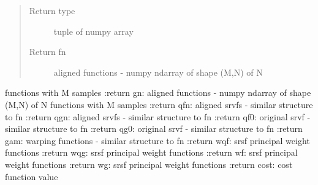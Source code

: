 \documentclass[letterpaper,10pt,english]{sphinxmanual}
\begin{document}
\begin{fulllineitems}
\begin{quote}
\begin{description}
\item[{Return type}] \leavevmode
tuple of numpy array

\item[{Return fn}] \leavevmode
aligned functions - numpy ndarray of shape (M,N) of N

\end{description}\end{quote}

functions with M samples
:return gn: aligned functions - numpy ndarray of shape (M,N) of N
functions with M samples
:return qfn: aligned srvfs - similar structure to fn
:return qgn: aligned srvfs - similar structure to fn
:return qf0: original srvf - similar structure to fn
:return qg0: original srvf - similar structure to fn
:return gam: warping functions - similar structure to fn
:return wqf: srsf principal weight functions
:return wqg: srsf principal weight functions
:return wf: srsf principal weight functions
:return wg: srsf principal weight functions
:return cost: cost function value

\end{fulllineitems}

\end{document}
